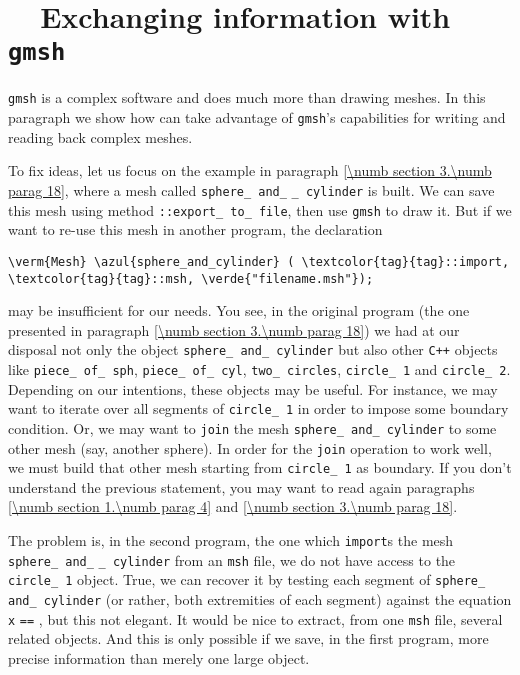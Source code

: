 \section{~~Exchanging information with {\tt gmsh}}\label{\numb section 8.\numb parag 3}

{\small\tt gmsh} is a complex software and does much more than drawing meshes.
In this paragraph we show how {\maniFEM} can take advantage of {\small\tt gmsh}'s capabilities
for writing and reading back complex meshes.

To fix ideas, let us focus on the example in paragraph \ref{\numb section 3.\numb parag 18},
where a mesh called {\small\tt sphere\_\,and\_} {\small\tt\_\,cylinder} is built.
We can save this mesh using method {\small\tt{}::export\_\,to\_\,file}, then use
{\small\tt gmsh} to draw it.
But if we want to re-use this mesh in another {\maniFEM} program, the declaration

\begin{Verbatim}[commandchars=\\\{\},formatcom=\small\tt,
   baselinestretch=0.94,framesep=2mm                     ]
   \verm{Mesh} \azul{sphere_and_cylinder} ( \textcolor{tag}{tag}::import, \textcolor{tag}{tag}::msh, \verde{"filename.msh"});
\end{Verbatim}

\noindent may be insufficient for our needs.
You see, in the original program (the one presented in paragraph
\ref{\numb section 3.\numb parag 18}) we had at our disposal not only the {\small\tt{}}
object {\small\tt sphere\_\,and\_\,cylinder} but also other {\tt C++} objects like
{\small\tt piece\_\,of\_\,sph}, {\small\tt piece\_\,of\_\,cyl}, {\small\tt two\_\,circles},
{\small\tt circle\_\,1} and {\small\tt circle\_\,2}.
Depending on our intentions, these objects may be useful.
For instance, we may want to iterate over all segments of {\small\tt circle\_\,1} in order to
impose some boundary condition.
Or, we may want to {\small\tt join} the mesh {\small\tt sphere\_\,and\_\,cylinder} to some
other mesh (say, another sphere).
In order for the {\small\tt join} operation to work well, we must build that other
mesh starting from {\small\tt circle\_\,1} as boundary.
If you don't understand the previous statement, you may want to read again paragraphs
\ref{\numb section 1.\numb parag 4} and \ref{\numb section 3.\numb parag 18}.

The problem is, in the second {\maniFEM} program, the one which {\small\tt import}s the mesh
{\small\tt sphere\_\,and\_} {\small\tt\_\,cylinder} from an {\small\tt msh} file,
we do not have access to the {\small\tt circle\_\,1} object.
True, we can recover it by testing each segment of {\small\tt sphere\_\,and\_\,cylinder}
(or rather, both extremities of each segment) against the equation {\small\tt x} {\small\tt ==}
{\small\tt{}}, but this not elegant.
It would be nice to extract, from one {\small\tt msh} file, several related
{\small\tt{}} objects.
And this is only possible if we save, in the first {\maniFEM} program, more precise information
than merely one large {\small\tt{}} object.

